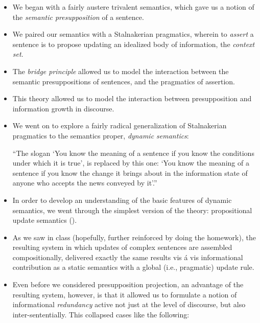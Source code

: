 \documentclass[nols,twoside,nofonts,nobib,nohyper]{tufte-handout}
\theoremstyle{definition}
\begin{document}
\begin{itemize}

    \item We began with a fairly austere trivalent semantics, which gave us a notion of the \textit{semantic presupposition} of a sentence.

    \item We paired our semantics with a Stalnakerian pragmatics, wherein to \textit{assert} a sentence is to propose updating an idealized body of information, the \textit{context set}.

    \item The \textit{bridge principle} allowed us to model the interaction between the semantic presuppositions of sentences, and the pragmatics of assertion.

    \item This theory allowed us to model the interaction between presupposition and information growth in discourse.

    \item We went on to explore a fairly radical generalization of Stalnakerian pragmatics to the semantics proper, \textit{dynamic semantics}:

    \begin{displayquote}
\enquote{The slogan `You know the meaning of a sentence if you know the conditions under which it is true', is replaced by this one: `You know the meaning of a sentence if you know the change it brings about in the information state of anyone who accepts the news conveyed by it'.}
\end{displayquote}

    \item In order to develop an understanding of the basic features of dynamic semantics, we went through the simplest version of the theory: propositional update semantics (\citealt{Veltman1996}).

    \item As we saw in class (hopefully, further reinforced by doing the homework), the resulting system in which updates of complex sentences are assembled compositionally, delivered exactly the same results vis á vis informational contribution as a static semantics with a global (i.e., pragmatic) update rule.

    \item Even before we considered presupposition projection, an advantage of the resulting system, however, is that it allowed us to formulate a notion of informational \textit{redundancy} active not just at the level of discourse, but also inter-sententially. This collapsed cases like the following:


\end{itemize}
\end{document}
